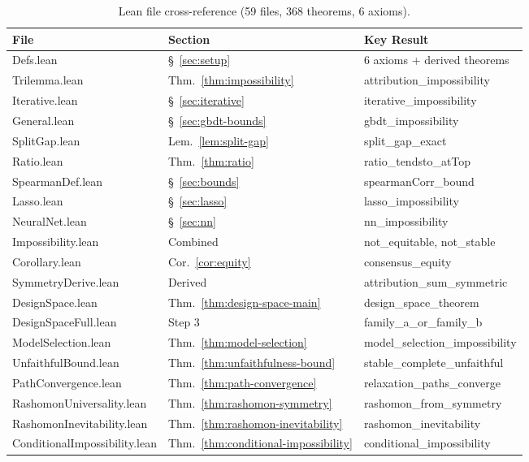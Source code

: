 \documentclass{jmlr}
\begin{document}
\begin{table}[t]
\centering
\caption{Lean file cross-reference (59 files, 368 theorems, 6 axioms).}
\label{tab:lean-crossref}
\scriptsize
\begin{tabular}{@{}p{3.8cm}ll@{}}
\toprule
\textbf{File} & \textbf{Section} & \textbf{Key Result} \\
\midrule
Defs.lean & \S~\ref{sec:setup} & 6 axioms + derived theorems \\
Trilemma.lean & Thm.~\ref{thm:impossibility} & attribution\_impossibility \\
Iterative.lean & \S~\ref{sec:iterative} & iterative\_impossibility \\
General.lean & \S~\ref{sec:gbdt-bounds} & gbdt\_impossibility \\
SplitGap.lean & Lem.~\ref{lem:split-gap} & split\_gap\_exact \\
Ratio.lean & Thm.~\ref{thm:ratio} & ratio\_tendsto\_atTop \\
SpearmanDef.lean & \S~\ref{sec:bounds} & spearmanCorr\_bound \\
Lasso.lean & \S~\ref{sec:lasso} & lasso\_impossibility \\
NeuralNet.lean & \S~\ref{sec:nn} & nn\_impossibility \\
Impossibility.lean & Combined & not\_equitable, not\_stable \\
Corollary.lean & Cor.~\ref{cor:equity} & consensus\_equity \\
SymmetryDerive.lean & Derived & attribution\_sum\_symmetric \\
DesignSpace.lean & Thm.~\ref{thm:design-space-main} & design\_space\_theorem \\
DesignSpaceFull.lean & Step 3 & family\_a\_or\_family\_b \\
ModelSelection.lean & Thm.~\ref{thm:model-selection} & model\_selection\_impossibility \\
UnfaithfulBound.lean & Thm.~\ref{thm:unfaithfulness-bound} & stable\_complete\_unfaithful \\
PathConvergence.lean & Thm.~\ref{thm:path-convergence} & relaxation\_paths\_converge \\
RashomonUniversality.lean & Thm.~\ref{thm:rashomon-symmetry} & rashomon\_from\_symmetry \\
RashomonInevitability.lean & Thm.~\ref{thm:rashomon-inevitability} & rashomon\_inevitability \\
ConditionalImpossibility.lean & Thm.~\ref{thm:conditional-impossibility} & conditional\_impossibility \\

\end{tabular}
\end{table}
\end{document}
